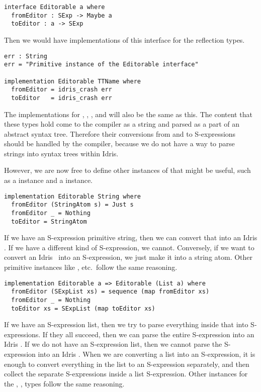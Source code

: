\begin{Verbatim}
interface Editorable a where
  fromEditor : SExp -> Maybe a
  toEditor : a -> SExp
\end{Verbatim}

Then we would have implementations of this interface for the reflection types.

\begin{Verbatim}
err : String
err = "Primitive instance of the Editorable interface"

implementation Editorable TTName where
  fromEditor = idris_crash err
  toEditor   = idris_crash err
\end{Verbatim}

The implementations for , , ,  and
 will also be the same as this.
The content that these types hold come to the compiler as a string and parsed
as a part of an abstract syntax tree. Therefore their conversions from and to
S-expressions should be handled by the compiler, because we do not have a way
to parse strings into syntax trees within Idris.

However, we are now free to define other instances of  that
might be useful, such as a \String instance and a  instance.

\begin{Verbatim}
implementation Editorable String where
  fromEditor (StringAtom s) = Just s
  fromEditor _ = Nothing
  toEditor = StringAtom
\end{Verbatim}

If we have an S-expression primitive string, then we can convert that into
an Idris \String. If we have a different kind of S-expression, we cannot.
Conversely, if we want to convert an Idris \String\ into an S-expression, we
just make it into a string atom. Other primitive instances like ,
 etc.\ follow the same reasoning.

\begin{Verbatim}
implementation Editorable a => Editorable (List a) where
  fromEditor (SExpList xs) = sequence (map fromEditor xs)
  fromEditor _ = Nothing
  toEditor xs = SExpList (map toEditor xs)
\end{Verbatim}

If we have an S-expression list, then we try to parse everything inside that
into S-expressions. If they all succeed, then we can parse the entire
S-expression into an Idris . If we do not have an S-expression list,
then we cannot parse the S-expression into an Idris .  When we are
converting a list into an S-expression, it is enough to convert everything in
the list to an S-expression separately, and then collect the separate
S-expressions inside a list S-expression. Other instances for the ,
,  types follow the same reasoning.
